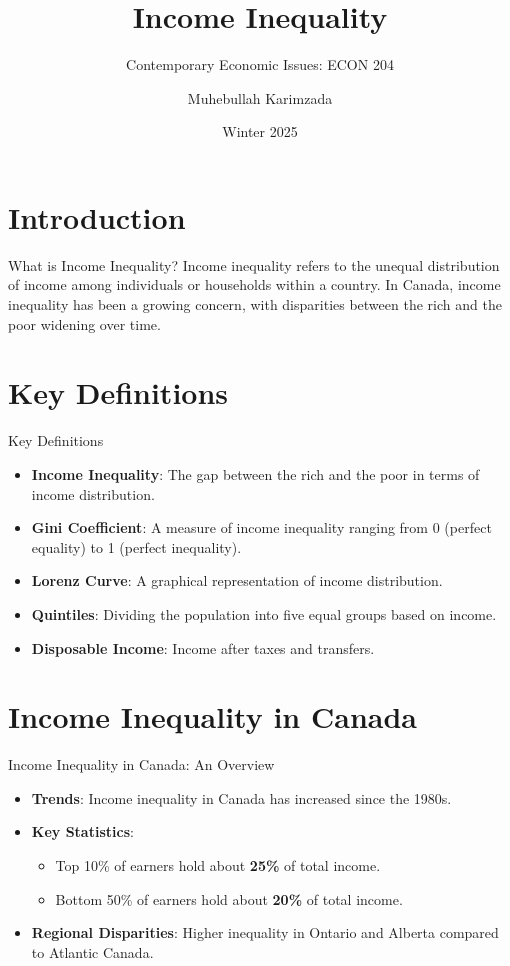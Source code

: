 \documentclass{beamer}
\title{Income Inequality}
\subtitle{Contemporary Economic Issues: ECON 204}
\author{Muhebullah Karimzada}
\date{Winter 2025}
\begin{document}
\begin{frame}
\titlepage
\end{frame}

\section{Introduction}

\begin{frame}{What is Income Inequality?}
Income inequality refers to the unequal distribution of income among individuals or households within a country. In Canada, income inequality has been a growing concern, with disparities between the rich and the poor widening over time.
\end{frame}

\section{Key Definitions}

\begin{frame}{Key Definitions}
\begin{itemize}
    \item \textbf{Income Inequality}: The gap between the rich and the poor in terms of income distribution.
    \item \textbf{Gini Coefficient}: A measure of income inequality ranging from 0 (perfect equality) to 1 (perfect inequality).
    \item \textbf{Lorenz Curve}: A graphical representation of income distribution.
    \item \textbf{Quintiles}: Dividing the population into five equal groups based on income.
    \item \textbf{Disposable Income}: Income after taxes and transfers.
\end{itemize}
\end{frame}

\section{Income Inequality in Canada}

\begin{frame}{Income Inequality in Canada: An Overview}
\begin{itemize}
    \item \textbf{Trends}: Income inequality in Canada has increased since the 1980s.
    \item \textbf{Key Statistics}:
        \begin{itemize}
            \item Top 10\% of earners hold about \textbf{25\%} of total income.
            \item Bottom 50\% of earners hold about \textbf{20\%} of total income.
        \end{itemize}
    \item \textbf{Regional Disparities}: Higher inequality in Ontario and Alberta compared to Atlantic Canada.
\end{itemize}
\end{frame}
\end{document}
